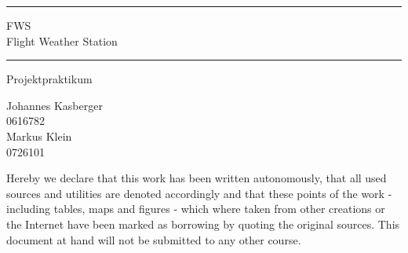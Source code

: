 \documentclass[a4paper,english,12pt,oneside]{memoir}
\newcommand\HRule{\noindent\rule{\linewidth}{1.5pt}}
\begin{document}
\begin{titlingpage}
    \HRule
    \begin{center}
        \LARGE FWS \\ 
        Flight Weather Station
    \end{center}
    \HRule
    \begin{center}
        \Large Projektpraktikum \\
        
     \end{center}
    \begin{center}
        \vspace{30pt}
        \normalsize Johannes Kasberger \\
        0616782 \\
        \vspace{15pt}
        Markus Klein \\
        0726101
     \end{center}
     \newpage
Hereby we declare that this work has been written autonomously, that all used sources and utilities are denoted accordingly and that these points of the work - including tables, maps and figures - which where taken from other creations or the Internet have been marked as borrowing by quoting the original sources. This document at hand will not be submitted to any other course.
 \end{titlingpage}

\tableofcontents
\newpage
\listoffigures
\listoftables








\end{document}
